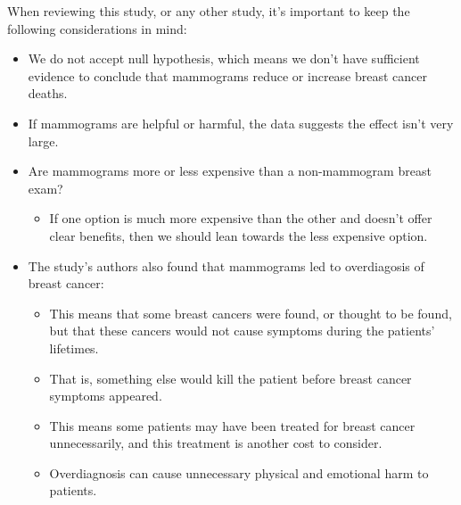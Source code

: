 \documentclass{beamer}
\begin{document}
\begin{frame}
  \begin{examplecont}
    When reviewing this study, or any other study, it's important to keep the following considerations in mind:\pause
    \begin{itemize}
    \item We do not accept null hypothesis, which means we don't have sufficient evidence to conclude that mammograms reduce or increase breast cancer deaths.\pause
    \item If mammograms are helpful or harmful, the data suggests the effect isn't very large.\pause
    \item Are mammograms more or less expensive than a non-mammogram breast exam?\pause
      \begin{itemize}
      \item If one option is much more expensive than the other and doesn't offer clear benefits, then we should lean towards the less expensive option.
      \end{itemize}
    \end{itemize}
  \end{examplecont}
\end{frame}

\begin{frame}
  \begin{examplecont}
    \begin{itemize}
    \item The study's authors also found that mammograms led to overdiagosis of breast cancer:
      \begin{itemize}
      \item This means that some breast cancers were found, or thought to be found, but that these cancers would not cause symptoms during the patients' lifetimes.\pause
      \item That is, something else would kill the patient before breast cancer symptoms appeared.\pause
      \item This means some patients may have been treated for breast cancer unnecessarily, and this treatment is another cost to consider.\pause
      \item Overdiagnosis can cause unnecessary physical and emotional harm to patients.
      \end{itemize}
    \end{itemize}
  \end{examplecont}
\end{frame}
\end{document}
